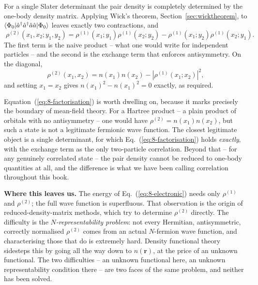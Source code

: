 For a single Slater determinant the pair density is completely determined by
the one-body density matrix.  Applying Wick's theorem,
Section~\ref{sec:wicktheorem}, to $\langle \Phi_0 | 
\hat{a}^{\dagger}\hat{a}^{\dagger}\hat{a}\hat{a} | \Phi_0 \rangle$ leaves exactly two
contractions, and
\begin{equation}
  \boxed{\;
  \rho^{(2)}(x_1,x_2;y_1,y_2)
   = \rho^{(1)}(x_1;y_1)\rho^{(1)}(x_2;y_2)
   - \rho^{(1)}(x_1;y_2)\rho^{(1)}(x_2;y_1).
  \;}
  \label{eq:8-factorisation}
\end{equation}
The first term is the naive product -- what one would write for independent
particles -- and the second is the exchange term that enforces antisymmetry.
On the diagonal,
\begin{equation}
  \rho^{(2)}(x_1,x_2) = n(x_1)n(x_2)
    - \left\vert\rho^{(1)}(x_1;x_2)\right\vert^2 ,
  \label{eq:8-pairdiagonal}
\end{equation}
and setting $x_1=x_2$ gives $n(x_1)^2-n(x_1)^2=0$ exactly, as required.

Equation~(\ref{eq:8-factorisation}) is worth dwelling on, because it marks
precisely the boundary of mean-field theory.  For a Hartree product -- a
plain product of orbitals with no antisymmetry -- one would have
$\rho^{(2)}=n(x_1)n(x_2)$, but such a state is not a legitimate fermionic wave
function.  The closest legitimate object is a single determinant, for which
Eq.~(\ref{eq:8-factorisation}) holds \emph{exactly}, with the exchange term as
the only two-particle correlation.  Beyond that -- for any genuinely
correlated state -- the pair density cannot be reduced to one-body quantities
at all, and the difference is what we have been calling correlation
throughout this book.

\begin{notebox}
\textbf{Where this leaves us.}  The energy of Eq.~(\ref{eq:8-electronic})
needs only $\rho^{(1)}$ and $\rho^{(2)}$; the full wave function is
superfluous.  That observation is the origin of reduced-density-matrix
methods, which try to determine $\rho^{(2)}$ directly.  The difficulty is
the \emph{$N$-representability problem}: not every Hermitian, antisymmetric,
correctly normalised $\rho^{(2)}$ comes from an actual $N$-fermion wave
function, and characterising those that do is extremely hard.  Density
functional theory sidesteps this by going all the way down to $n(\bm{r})$, at
the price of an unknown functional.  The two difficulties -- an unknown
functional here, an unknown representability condition there -- are two faces
of the same problem, and neither has been solved.
\end{notebox}


